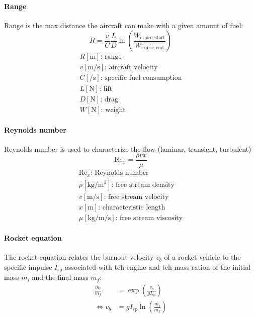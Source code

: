 \documentclass[10pt, twocolumn]{article}
\begin{document}
\paragraph{Range}
Range is the max distance the aircraft can make with a given amount of fuel:
\[
  R = \frac{v}{C} \frac{L}{D} \ln\left( \frac{W_\mathrm{cruise,start}}{W_\mathrm{cruise,end}} \right)
\]
\[
  \begin{array}{|l}
    R [\si{\metre}] \text{: range}                          \\
    v [\si{\metre\per\second}] \text{: aircraft velocity}   \\
    C [\si{\per\second}] \text{: specific fuel consumption} \\
    L [\si{\newton}] \text{: lift}                          \\
    D [\si{\newton}] \text{: drag}                          \\
    W [\si{\newton}] \text{: weight}
  \end{array}
\]

\paragraph{Reynolds number}
Reynolds number is used to characterize the flow (laminar, transient, turbulent)
\[
  \mathrm{Re}_x = \frac{\rho v x}{\mu}
\]
\[
  \begin{array}{|l}
    \mathrm{Re}_x \text{: Reynolds number}                             \\
    \rho [\si{\kilogram\per\metre\cubed}] \text{: free stream density} \\
    v [\si{\metre\per\second}] \text{: free stream velocity}           \\
    x [\si{\metre}] \text{: characteristic length}                     \\
    \mu [\si{\kilogram\per\meter\per\second}] \text{: free stream viscosity}
  \end{array}
\]

\paragraph{Rocket equation}
The rocket equation relates the burnout velocity \(v_b\) of a rocket vehicle to the specific impulse \(I_\mathrm{sp}\) associated with teh engine and teh mass ration of the initial mass \(m_i\) and the final mass \(m_f\):
\begin{align*}
  \frac{m_i}{m_f} & = \exp \left( \frac{v_b}{g I_\mathrm{sp}} \right)   \\
  \iff v_b        & = g I_\mathrm{sp} \ln\left( \frac{m_i}{m_f} \right)
\end{align*}
\end{document}
